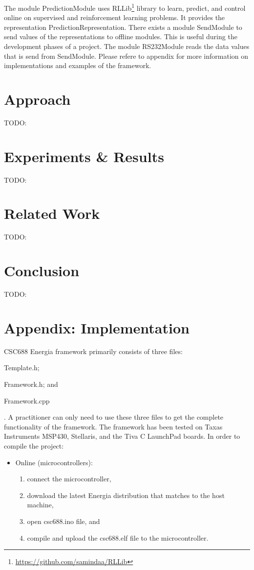 \documentclass{llncs}
\begin{document}
\begin{sloppy}
The module {\sf PredictionModule} uses {\sf
RLLib}\footnote{\url{https://github.com/samindaa/RLLib}} library to learn, predict, and control
online on supervised and reinforcement learning problems. It provides
the representation {\sf PredictionRepresentation}. There exists a module {\sf SendModule} to send
values of the representations to offline modules. This is useful during the development phases of
a project. The module {\sf RS232Module} reads the data values that is send from {\sf SendModule}.
Please refere  to appendix for more information on implementations and
examples of the framework.

\section{Approach}
TODO:

\section{Experiments \& Results}
TODO:

\section{Related Work}
TODO:

\section{Conclusion}
TODO:




\section*{Appendix: Implementation}
\label{appendix:Implementation}
CSC688 Energia framework primarily consists of three files: \begin{inparaenum}[(1)] \item
\label{fmw:A} {\sf Template.h}; \item \label{fmw:B} {\sf Framework.h}; and \item \label{fmw:C} {\sf
Framework.cpp}\end{inparaenum}. A practitioner can only need to use these three files to get the
complete functionality of the framework. The framework has been tested on Taxas Instruments MSP430,
Stellaris, and the Tiva C LaunchPad boards. In order to compile the project:

\begin{itemize}
 \item Online (microcontrollers):
\begin{enumerate}
\item connect the microcontroller,
\item download the latest Energia distribution that matches to the host machine,
\item open {\sf csc688.ino} file, and 
\item compile and upload the {\sf csc688.elf} file to the microcontroller.
\end{enumerate}


\end{itemize}
\end{sloppy}
\end{document}
